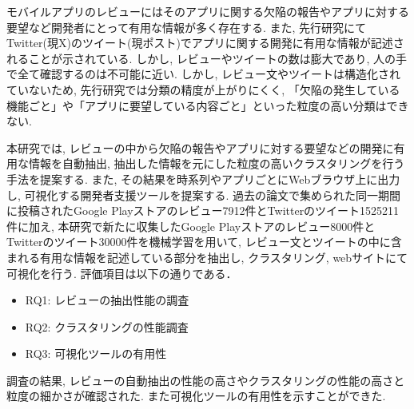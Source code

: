 
モバイルアプリのレビューにはそのアプリに関する欠陥の報告やアプリに対する要望など開発者にとって有用な情報が多く存在する. また, 先行研究にてTwitter(現X)のツイート(現ポスト)でアプリに関する開発に有用な情報が記述されることが示されている. しかし, レビューやツイートの数は膨大であり, 人の手で全て確認するのは不可能に近い. 
しかし, レビュー文やツイートは構造化されていないため, 先行研究では分類の精度が上がりにくく, 「欠陥の発生している機能ごと」や「アプリに要望している内容ごと」といった粒度の高い分類はできない. 

本研究では, レビューの中から欠陥の報告やアプリに対する要望などの開発に有用な情報を自動抽出, 抽出した情報を元にした粒度の高いクラスタリングを行う手法を提案する. また, その結果を時系列やアプリごとにWebブラウザ上に出力し, 可視化する開発者支援ツールを提案する.
過去の論文で集められた同一期間に投稿されたGoogle Playストアのレビュー7912件とTwitterのツイート1525211件に加え, 本研究で新たに収集したGoogle Playストアのレビュー8000件とTwitterのツイート30000件を機械学習を用いて, レビュー文とツイートの中に含まれる有用な情報を記述している部分を抽出し, クラスタリング, webサイトにて可視化を行う. 評価項目は以下の通りである．
\begin{itemize}
    \item RQ1: レビューの抽出性能の調査
    \item RQ2: クラスタリングの性能調査
    \item RQ3: 可視化ツールの有用性
\end{itemize}

調査の結果, レビューの自動抽出の性能の高さやクラスタリングの性能の高さと粒度の細かさが確認された. また可視化ツールの有用性を示すことができた. 
